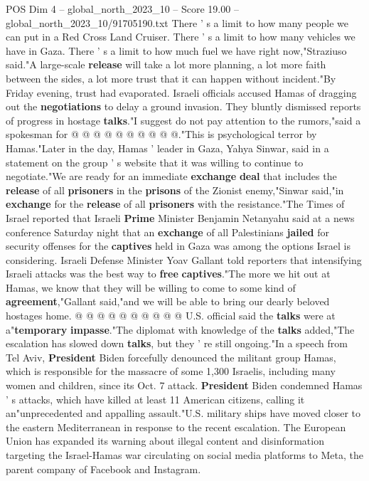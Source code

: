 \begin{textsample}{POS Dim 4 – global\_north\_2023\_10 – Score 19.00 – global\_north\_2023\_10/91705190.txt}
There ' s a limit to how many people we can put in a Red Cross Land Cruiser.
There ' s a limit to how many vehicles we have in Gaza.
There ' s a limit to how much fuel we have right now,"Straziuso said."A large-scale \textbf{release} will take a lot more planning, a lot more faith between the sides, a lot more trust that it can happen without incident."By Friday evening, trust had evaporated.
Israeli officials accused Hamas of dragging out the \textbf{negotiations} to delay a ground invasion.
They bluntly dismissed reports of progress in hostage \textbf{talks}."I suggest do not pay attention to the rumors,"said a spokesman for @ @ @ @ @ @ @ @ @ @."This is psychological terror by Hamas."Later in the day, Hamas ' leader in Gaza, Yahya Sinwar, said in a statement on the group ' s website that it was willing to continue to negotiate."We are ready for an immediate \textbf{exchange} \textbf{deal} that includes the \textbf{release} of all \textbf{prisoners} in the \textbf{prisons} of the Zionist enemy,"Sinwar said,"in \textbf{exchange} for the \textbf{release} of all \textbf{prisoners} with the resistance."The Times of Israel reported that Israeli \textbf{Prime} Minister Benjamin Netanyahu said at a news conference Saturday night that an \textbf{exchange} of all Palestinians \textbf{jailed} for security offenses for the \textbf{captives} held in Gaza was among the options Israel is considering.
Israeli Defense Minister Yoav Gallant told reporters that intensifying Israeli attacks was the best way to \textbf{free} \textbf{captives}."The more we hit out at Hamas, we know that they will be willing to come to some kind of \textbf{agreement},"Gallant said,"and we will be able to bring our dearly beloved hostages home. @ @ @ @ @ @ @ @ @ @ U.S. official said the \textbf{talks} were at a"\textbf{temporary} \textbf{impasse}."The diplomat with knowledge of the \textbf{talks} added,"The escalation has slowed down \textbf{talks}, but they ' re still ongoing."In a speech from Tel Aviv, \textbf{President} Biden forcefully denounced the militant group Hamas, which is responsible for the massacre of some 1,300 Israelis, including many women and children, since its Oct. 7 attack. \textbf{President} Biden condemned Hamas ' s attacks, which have killed at least 11 American citizens, calling it an"unprecedented and appalling assault."U.S. military ships have moved closer to the eastern Mediterranean in response to the recent escalation.
The European Union has expanded its warning about illegal content and disinformation targeting the Israel-Hamas war circulating on social media platforms to Meta, the parent company of Facebook and Instagram.

\end{textsample}
